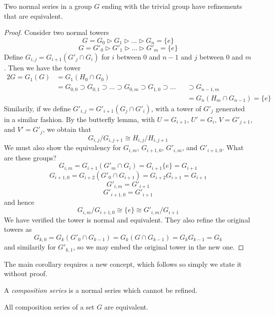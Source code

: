 \begin{theorem}[Shreier]
    Two normal series in a group $G$ ending with the trivial group have refinements that are equivalent.
\end{theorem}
\begin{proof}
    Consider two normal towers
    \[ G = G_0 \rhd G_1 \rhd \dots \rhd G_n = \{ e \} \]
    \[ G = G'_0 \rhd G'_1 \rhd \dots \rhd G'_m = \{ e \} \]
    Define $G_{i,j} = G_{i+1}(G'_j \cap G_i)$ for $i$ between 0 and $n-1$ and $j$ between 0 and $m$. Then we have the tower
    \begin{alignat*}{2}
    G = G_1(G) &= G_1(H_0 \cap G_0) &\\
               &= G_{0,0} \supset G_{0,1} \supset \dots \supset G_{0,m} \supset G_{1,0} \supset \dots &&\supset G_{n-1,m}\\
                &           &&= G_n(H_m \cap G_{n-1}) = \{ e \}
    \end{alignat*}
    Similarily, if we define $G'_{i,j} = G'_{i+1}(G_j \cap G'_i)$, with a tower of $G'_j$ generated in a similar fashion. By the butterfly lemma, with $U = G_{i+1}$, $U' = G_i$, $V = G'_{j+1}$, and $V' = G'_j$, we obtain that
    \[ G_{i,j}/G_{i,j+1} \cong H_{i,j}/H_{i,j+1} \]
    We must also show the equivalency for $G_{i,m}$, $G_{i+1,0}$, $G'_{i,m}$, and $G'_{i+1,0}$. What are these groups?
    \[ G_{i,m} = G_{i+1}(G'_m \cap G_i) = G_{i+1}\{e\} = G_{i+1} \]
    \[ G_{i+1,0} = G_{i+2}(G'_0 \cap G_{i+1}) = G_{i+2}G_{i+1} = G_{i+1} \]
    \[ G'_{i,m} = G'_{i+1} \]
    \[ G'_{i+1,0} = G'_{i+1} \]
    and hence
    \[ G_{i,m}/G_{i+1,0} \cong \{e\} \cong G'_{i,m}/G_{i+1} \]
    We have verified the tower is normal and equivalent. They also refine the original towers as
    \[ G_{k,0} = G_k(G'_0 \cap G_{k-1}) = G_k(G \cap G_{k-1}) = G_kG_{k-1} = G_k \]
    and similarily for $G'_{k,1}$, so we may embed the original tower in the new one.
\end{proof}

The main corollary requires a new concept, which follows so simply we state it without proof.

A \emph{composition series} is a normal series which cannot be refined.

\begin{corollary}
    All composition series of a set $G$ are equivalent.
\end{corollary}

